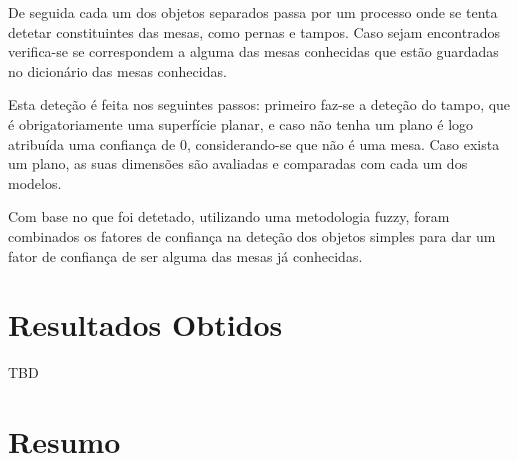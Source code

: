 De seguida cada um dos objetos separados passa por um processo onde se tenta 
detetar constituintes das mesas, como pernas e tampos. Caso sejam encontrados 
verifica-se se correspondem a alguma das mesas conhecidas que estão guardadas
no dicionário das mesas conhecidas.

Esta deteção é feita nos seguintes passos: primeiro faz-se a deteção do tampo, que é obrigatoriamente uma superfície planar, e caso não tenha um plano é logo atribuída uma confiança de 0, considerando-se que não é uma mesa.
Caso exista um plano, as suas dimensões são avaliadas e comparadas com cada um dos modelos.


Com base no que foi detetado, utilizando uma metodologia fuzzy, foram combinados os fatores de confiança na deteção dos objetos simples para dar um fator de confiança de ser alguma das mesas já conhecidas.



\section {Resultados Obtidos}

TBD

\section{Resumo}


